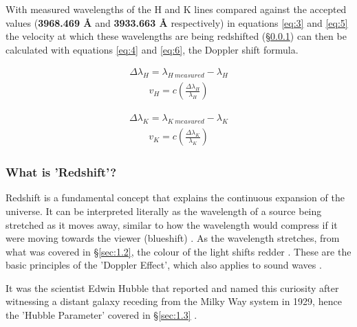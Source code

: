 \documentclass[12pt]{article}
\begin{document}
With measured wavelengths of the H and K lines compared against the accepted values \break (\textbf{3968.469 Å} and \textbf{3933.663 Å} respectively) in equations \ref{eq:3} and \ref{eq:5}
the velocity at which these wavelengths are being redshifted (§\ref{sec:1.2.3}) can then be calculated with equations \ref{eq:4} and \ref{eq:6}, the Doppler shift formula.

\begin{minipage}{0.45\textwidth}
    \begin{gather} \label{eq:3}
        \Delta \lambda_H = \lambda_{H \: measured} - \lambda_H 
    \end{gather}
    \vspace{-1.5em}
    \begin{gather} \label{eq:4}
        v_H = c \left( \frac{\Delta \lambda_H}{\lambda_H} \right)
    \end{gather}
\end{minipage}
\hfill
\begin{minipage}{0.45\textwidth}
    \begin{gather} \label{eq:5}
        \Delta \lambda_K = \lambda_{K \: measured} - \lambda_K 
    \end{gather}
    \vspace{-1.5em}
    \begin{gather} \label{eq:6}
        v_K = c \left( \frac{\Delta \lambda_K}{\lambda_K} \right)
    \end{gather}
\end{minipage}

\subsubsection{What is 'Redshift'?} \label{sec:1.2.3}

Redshift is a fundamental concept that explains the continuous expansion of the universe.
It can be interpreted literally as the wavelength of a source being stretched as it moves away, similar to how the wavelength would compress if it were moving towards the viewer (blueshift)
\cite{esaredshift,earthskyredshift}.
As the wavelength stretches, from what was covered in §\ref{sec:1.2}, the colour of the light shifts redder
\cite{esaredshift}.
These are the basic principles of the 'Doppler Effect', which also applies to sound waves
\cite{esaredshift,lcoredshift,britredshift,earthskyredshift}.

It was the scientist Edwin Hubble that reported and named this curiosity after witnessing a distant galaxy receding from the Milky Way system in 1929, hence the 
'Hubble Parameter' covered in §\ref{sec:1.3}
\cite{britredshift}.
\end{document}
